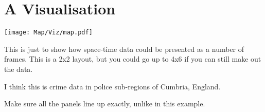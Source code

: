 
\chapter{A Visualisation}

\begin{marginfigure}
\texttt{[image: Map/Viz/map.pdf]}
\end{marginfigure}

This is just to show how space-time data could be presented
as a number of frames. This is a 2x2 layout, but you could
go up to 4x6 if you can still make out the data.

I think this is crime data in police sub-regions of Cumbria, England.

Make sure all the panels line up exactly, unlike in this example.

